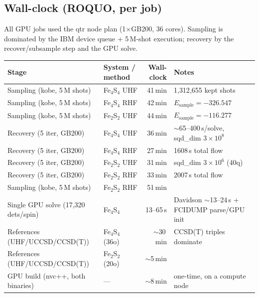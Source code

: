\documentclass[11pt]{article}
\begin{document}
\subsection{Wall-clock (ROQUO, per job)}
All GPU jobs used the qtr node plan (1$\times$GB200, 36 cores). Sampling is dominated by the
IBM device queue + 5\,M-shot execution; recovery by the recover/subsample step and the GPU solve.
\begin{longtable}{@{}llrl@{}}
\toprule
Stage & System / method & Wall-clock & Notes \\
\midrule\endhead
Sampling (kobe, 5\,M shots) & Fe$_4$S$_4$ UHF & 41\,min & 1{,}312{,}655 kept shots \\
Sampling (kobe, 5\,M shots) & Fe$_4$S$_4$ RHF & 42\,min & $E_{\text{sample}}=-326.547$ \\
Sampling (kobe, 5\,M shots) & Fe$_2$S$_2$ UHF & 44\,min & $E_{\text{sample}}=-116.277$ \\
Recovery (5 iter, GB200)    & Fe$_4$S$_4$ UHF & 36\,min & $\sim$65--400\,s/solve, sqd\_dim $3\times10^8$ \\
Recovery (5 iter, GB200)    & Fe$_4$S$_4$ RHF & 27\,min & 1608\,s total flow \\
Recovery (5 iter, GB200)    & Fe$_2$S$_2$ UHF & 31\,min & sqd\_dim $3\times10^6$ (40q) \\
Recovery (5 iter, GB200)    & Fe$_2$S$_2$ RHF & 33\,min & 2007\,s total flow \\
Sampling (kobe, 5\,M shots) & Fe$_2$S$_2$ RHF & 51\,min & \\
Single GPU solve (17{,}320 dets/spin) & Fe$_4$S$_4$ & 13--65\,s & Davidson $\sim$13--24\,s + FCIDUMP parse/GPU init \\
References (UHF/UCCSD/CCSD(T)) & Fe$_4$S$_4$ (36o) & $\sim$30\,min & CCSD(T) triples dominate \\
References (UHF/UCCSD/CCSD(T)) & Fe$_2$S$_2$ (20o) & $\sim$5\,min & \\
GPU build (nvc++, both binaries) & --- & $\sim$8\,min & one-time, on a compute node \\
\bottomrule
\end{longtable}
\end{document}
